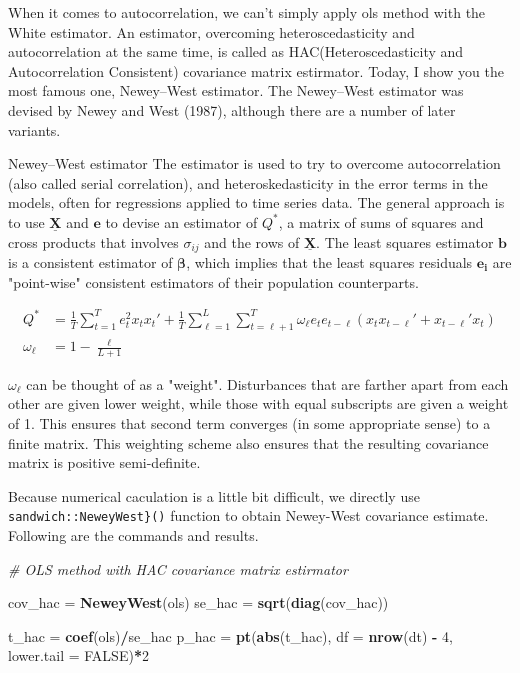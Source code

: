 \documentclass[
  12pt,
]{article}
\newenvironment{Shaded}{\begin{snugshade}}{\end{snugshade}}
\newcommand{\CommentTok}[1]{\textcolor[rgb]{0.56,0.35,0.01}{\textit{#1}}}
\newcommand{\DataTypeTok}[1]{\textcolor[rgb]{0.13,0.29,0.53}{#1}}
\newcommand{\DecValTok}[1]{\textcolor[rgb]{0.00,0.00,0.81}{#1}}
\newcommand{\KeywordTok}[1]{\textcolor[rgb]{0.13,0.29,0.53}{\textbf{#1}}}
\newcommand{\NormalTok}[1]{#1}
\newcommand{\OperatorTok}[1]{\textcolor[rgb]{0.81,0.36,0.00}{\textbf{#1}}}
\newcommand{\OtherTok}[1]{\textcolor[rgb]{0.56,0.35,0.01}{#1}}
\newcommand{\StringTok}[1]{\textcolor[rgb]{0.31,0.60,0.02}{#1}}
\begin{document}
When it comes to autocorrelation, we can't simply apply ols method with the White estimator. An estimator, overcoming heteroscedasticity and autocorrelation at the same time, is called as HAC(Heteroscedasticity and Autocorrelation Consistent) covariance matrix estirmator. Today, I show you the most famous one, Newey--West estimator.
The Newey--West estimator was devised by Newey and West (1987),
although there are a number of later variants.

\begin{itembox}[1]{Newey–West estimator}
The estimator is used to try to overcome autocorrelation (also called serial correlation), and heteroskedasticity in the error terms in the models, often for regressions applied to time series data.
The general approach is to use $\underline{\mathbf{X}}$ and $\mathbf{e}$ to devise an estimator of $Q^{*}$,  a matrix of sums of squares and cross products that involves $\sigma_{ij}$ and the rows of $\underline{\mathbf{X}}$. The least squares estimator $\mathbf{b}$ is a consistent estimator of $\mathbf{\beta}$, which implies that the least squares residuals $\mathbf{e_i}$ are "point-wise" consistent estimators of their population counterparts.

\begin{align*}
    Q^{*} & = \frac{1}{T}\sum_{t=1}^{T}e_t^2 x_t x_t ' + \frac{1}{T}\sum_{\ell=1}^{L}\sum_{t=\ell+1}^{T}\omega_{\ell}e_t e_{t-\ell}(x_t x_{t-\ell}' + x_{t-\ell}' x_t ) \\
    \omega_{\ell} & = 1 - \frac{\ell}{L+1}
\end{align*}

$\omega_{\ell}$ can be thought of as a "weight". Disturbances that are farther apart from each other are given lower weight, while those with equal subscripts are given a weight of 1. This ensures that second term converges (in some appropriate sense) to a finite matrix. This weighting scheme also ensures that the resulting covariance matrix is positive semi-definite.
\end{itembox}

Because numerical caculation is a little bit difficult, we directly use \texttt{sandwich::NeweyWest\}()} function to obtain Newey-West covariance estimate. Following are the commands and results.

\begin{Shaded}
\begin{Highlighting}[]
\CommentTok{\# OLS method with HAC covariance matrix estirmator}

\NormalTok{cov\_hac =}\StringTok{ }\KeywordTok{NeweyWest}\NormalTok{(ols)}
\NormalTok{se\_hac =}\StringTok{ }\KeywordTok{sqrt}\NormalTok{(}\KeywordTok{diag}\NormalTok{(cov\_hac))}

\NormalTok{t\_hac =}\StringTok{ }\KeywordTok{coef}\NormalTok{(ols)}\OperatorTok{/}\NormalTok{se\_hac}
\NormalTok{p\_hac =}\StringTok{ }\KeywordTok{pt}\NormalTok{(}\KeywordTok{abs}\NormalTok{(t\_hac), }\DataTypeTok{df =} \KeywordTok{nrow}\NormalTok{(dt) }\OperatorTok{{-}}\StringTok{ }\DecValTok{4}\NormalTok{, }\DataTypeTok{lower.tail =} \OtherTok{FALSE}\NormalTok{)}\OperatorTok{*}\DecValTok{2}
\end{Highlighting}
\end{Shaded}
\end{document}
